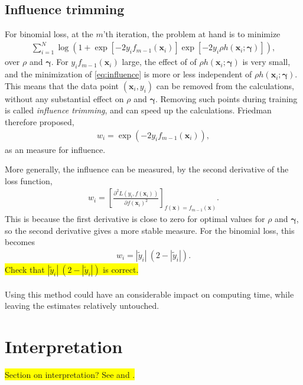 \subsection{Influence trimming}
\label{sub:Influence trimming}
For binomial loss, at the $m$'th iteration, the problem at hand is to minimize
\begin{align}
  \label{eq:influence} 
  \sum_{i = 1}^{N} \log \left( 1 + \exp[ -2 y_i f_{m-1}(\mathbf{x}_i)] \exp [-2 y_i \rho h(\mathbf{x}_i; \bm \gamma)] \right),
\end{align}
over $\rho$ and $\bm \gamma$.  For $y_i f_{m-1}(\mathbf{x}_i)$ large, the effect of of $\rho h(\mathbf{x}_i; \bm{\gamma})$ is very small, and the minimization of \eqref{eq:influence} is more or less independent of $\rho h(\mathbf{x}_i; \bm \gamma)$. This means that the data point $(\mathbf{x}_i, y_i)$ can be removed from the calculations, without any substantial effect on $\rho$ and $\bm \gamma$. Removing such points during training is called \textit{influence trimming}, and can speed up the calculations. Friedman therefore proposed,
\begin{align}
  w_i = \exp (- 2 y_i f_{m-1}(\mathbf{x}_i)), 
\end{align}
as an measure for influence. 

More generally, the influence can be measured, by the second derivative of the loss function,
\begin{align}
  w_i = \left[ \frac{\partial^2 L(y_i, f(\mathbf{x}_i)) }{\partial f(\mathbf{x}_i)^2}  \right]_{f(\mathbf{x}) = f_{m-1}(\mathbf{x})}.
\end{align}
This is because the first derivative is close to zero for optimal values for $\rho$ and $\bm \gamma$, so the second derivative gives a more stable measure.  For the binomial loss, this becomes 
\begin{align}
  w_i = |\tilde y_i| \: (2 - |\tilde y_i|). 
\end{align}
\colorbox{yellow}{Check that $|\tilde{y}_i|\: (2 - |\tilde{y}_i|)$ is correct.}\\
\\
Using this method could have an considerable impact on computing time, while leaving the estimates relatively untouched. 




\section{Interpretation}
\label{sec:Interpretation}
\colorbox{yellow}{Section on interpretation? See \cite[10.3]{modstat} and \cite{friedman}.}

